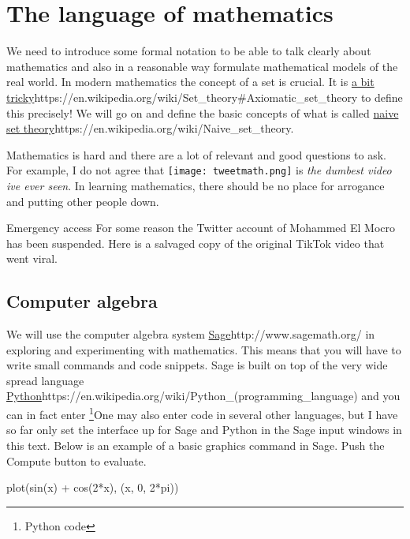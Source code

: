 \documentclass{article}
\begin{document}

\chapter{The language of mathematics}

We need to introduce some formal notation to be able to talk clearly about mathematics and also in a reasonable way 
formulate mathematical models of the real world. In modern mathematics the 
concept of a set is crucial. It is \url{a bit tricky}{https://en.wikipedia.org/wiki/Set_theory\#Axiomatic_set_theory} to define this precisely!
We will go on and define the basic concepts of what is called 
\url{naive set theory}{https://en.wikipedia.org/wiki/Naive_set_theory}.

Mathematics is hard and there are a lot of relevant and good questions
to ask. For example, I do not agree that
\texttt{[image: tweetmath.png]}
is \emph{the dumbest video ive ever seen}. In learning mathematics,
there should be no place for arrogance and putting other people down.

\begin{hideinbutton}{Emergency access}
  For some reason the Twitter account of Mohammed El Mocro %
  has been suspended. Here is a salvaged copy of the original TikTok video that went viral.


\end{hideinbutton}

\section{Computer algebra}

We will use the computer algebra system
\url{Sage}{http://www.sagemath.org/} in exploring and experimenting
with mathematics. This means that you will have to write small
commands and code snippets. Sage is built on top of the very wide
spread language
\url{Python}{https://en.wikipedia.org/wiki/Python_(programming_language)}
and you can in fact enter \footnote{Python code}{One may also enter code in several other languages, but I have so far only set the interface up for Sage and Python} in
the Sage input windows in this text. Below is an example of a basic
graphics command in Sage.  Push the Compute button to evaluate.


\begin{sage}
plot(sin(x) + cos(2*x), (x, 0, 2*pi))
\end{sage}
\end{document}
